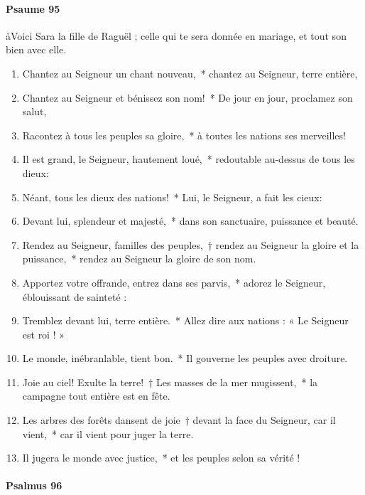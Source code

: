 \documentclass[twoside]{article}
\begin{document}
\begin{paracol}[1]{2}
\switchcolumn

\paragraph{Psaume 95}
\aa Voici Sara la fille de Raguël ; celle qui te sera donnée en mariage, et tout son bien avec elle.


\begin{enumerate}[wide, itemsep=0mm, labelwidth=!, labelindent=0pt, label=\color{gregoriocolor}\theenumi]
\item Chantez au Seigneur un chant nouveau,~* chantez au Seigneur, terre entière,
\item Chantez au Seigneur et bénissez son nom!~* De jour en jour, proclamez son salut,
\item Racontez à tous les peuples sa gloire,~* à toutes les nations ses merveilles!
\item Il est grand, le Seigneur, hautement loué,~* redoutable au-dessus de tous les dieux:
\item Néant, tous les dieux des nations!~* Lui, le Seigneur, a fait les cieux:
\item Devant lui, splendeur et majesté,~* dans son sanctuaire, puissance et beauté.
\item Rendez au Seigneur, familles des peuples,~† rendez au Seigneur la gloire et la puissance,~* rendez au Seigneur la gloire de son nom.
\item Apportez votre offrande, entrez dans ses parvis,~* adorez le Seigneur, éblouissant de sainteté : 
\item Tremblez devant lui, terre entière.~* Allez dire aux nations : « Le Seigneur est roi ! » 
\item Le monde, inébranlable, tient bon.~* Il gouverne les peuples avec droiture.
\item Joie au ciel! Exulte la terre!~† Les masses de la mer mugissent,~* la campagne tout entière est en fête. 
\item Les arbres des forêts dansent de joie~† devant la face du Seigneur, car il vient,~* car il vient pour juger la terre.
\item Il jugera le monde avec justice,~* et les peuples selon sa vérité !
\end{enumerate}

\switchcolumn*

\paragraph{Psalmus 96}


\end{paracol}
\end{document}
